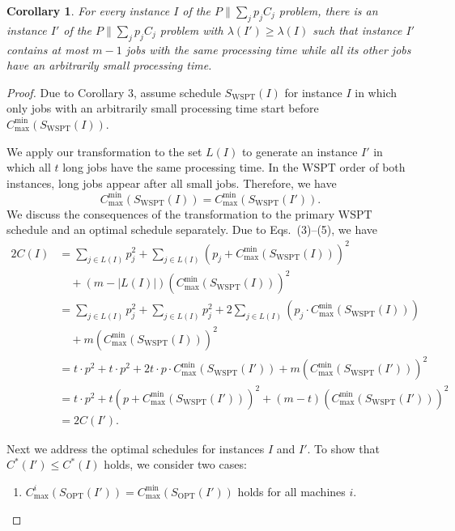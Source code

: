 \documentclass[11pt]{article}
\newtheorem{corollary}{Corollary}
\newcommand{\WSPT}{\mathrm{WSPT}}
\newcommand{\OPT}{\mathrm{OPT}}
\newcommand{\Cmin}{C_{\max}^{\min}}
\begin{document}
\begin{corollary}
For every instance $I$ of the $P\|\sum_j p_j C_j$ problem, there is an
instance $I'$ of the $P\|\sum_j p_j C_j$ problem with
$\lambda(I')\geq\lambda(I)$ such that instance $I'$ contains at most $m-1$
jobs with the same processing time while all its other jobs have an
arbitrarily small processing time.
\end{corollary}

\begin{proof}
Due to Corollary 3, assume schedule $S_{\WSPT}(I)$ for instance $I$ in which
only jobs with an arbitrarily small processing time start before
$\Cmin(S_{\WSPT}(I))$.

We apply our transformation to the set $L(I)$ to generate an instance $I'$ in
which all $t$ long jobs have the same processing time. In the \(\mathrm{WSPT}\) order of
both instances, long jobs appear after all small jobs. Therefore, we have
\[
        \Cmin(S_{\WSPT}(I))=\Cmin(S_{\WSPT}(I')).
\]
We discuss the consequences of the transformation to the primary \(\mathrm{WSPT}\) schedule
and an optimal schedule separately. Due to Eqs.~(3)--(5), we have
\[
\begin{aligned}
        2C(I)
        &=
        \sum_{j\in L(I)}p_j^2
        +
        \sum_{j\in L(I)}(p_j+\Cmin(S_{\WSPT}(I)))^2                  \\
        &\quad
        +(m-|L(I)|)(\Cmin(S_{\WSPT}(I)))^2                           \\
        &=
        \sum_{j\in L(I)}p_j^2
        +
        \sum_{j\in L(I)}p_j^2
        +
        2\sum_{j\in L(I)}(p_j\cdot\Cmin(S_{\WSPT}(I)))               \\
        &\quad
        +m(\Cmin(S_{\WSPT}(I)))^2                                    \\
        &=
        t\cdot p^2+t\cdot p^2
        +2t\cdot p\cdot\Cmin(S_{\WSPT}(I'))
        +m(\Cmin(S_{\WSPT}(I')))^2                                  \\
        &=
        t\cdot p^2
        +t(p+\Cmin(S_{\WSPT}(I')))^2
        +(m-t)(\Cmin(S_{\WSPT}(I')))^2                              \\
        &=
        2C(I').
\end{aligned}
\]

Next we address the optimal schedules for instances $I$ and $I'$. To show
that $C^*(I')\leq C^*(I)$ holds, we consider two cases:

\begin{enumerate}[label=(\arabic*)]
\item
$C_{\max}^i(S_{\OPT}(I'))=\Cmin(S_{\OPT}(I'))$ holds for all machines $i$.


\end{enumerate}
\end{proof}
\end{document}
